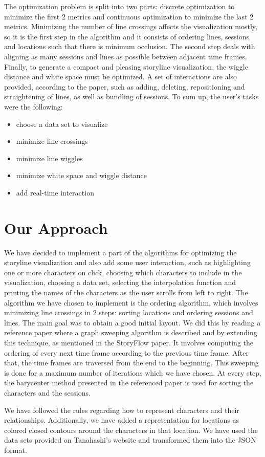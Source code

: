 \documentclass{report}
\begin{document}
\par
The optimization problem is split into two parts: discrete optimization to minimize the first 2 metrics and continuous optimization to minimize the last 2 metrics. Minimizing the number of line crossings affects the visualization mostly, so it is the first step in the algorithm and it consists of ordering lines, sessions and locations such that there is minimum occlusion. The second step deals with aligning as many sessions and lines as possible between adjacent time frames. Finally, to generate a compact and pleasing storyline visualization, the wiggle distance and white space must be optimized. A set of interactions are also provided, according to the paper, such as adding, deleting, repositioning and straightening of lines, as well as bundling of sessions. To sum up, the user's tasks were the following:
\begin{itemize}
\item choose a data set to visualize
\item minimize line crossings
\item minimize line wiggles
\item minimize white space and wiggle distance
\item add real-time interaction
\end{itemize}

\chapter{Our Approach}
\par
We have decided to implement a part of the algorithms for optimizing the storyline visualization and also add some user interaction, such as highlighting one or more characters on click, choosing which characters to include in the visualization, choosing a data set, selecting the interpolation function and printing the names of the characters as the user scrolls from left to right. The algorithm we have chosen to implement is the ordering algorithm, which involves minimizing line crossings in 2 steps: sorting locations and ordering sessions and lines. The main goal was to obtain a good initial layout. We did this by reading a reference paper \cite{4308636} where a graph sweeping algorithm is described and by extending this technique, as mentioned in the StoryFlow paper. It involves computing the ordering of every next time frame according to the previous time frame. After that, the time frames are traversed from the end to the beginning. This sweeping is done for a maximum number of iterations which we have chosen. At every step, the barycenter method presented in the referenced paper is used for sorting the characters and the sessions.
\par
We have followed the rules regarding how to represent characters and their relationships. Additionally, we have added a representation for locations as colored closed contours around the characters in that location. We have used the data sets provided on Tanahashi's website \cite{website:tanahashi} and transformed them into the JSON format.
\end{document}
